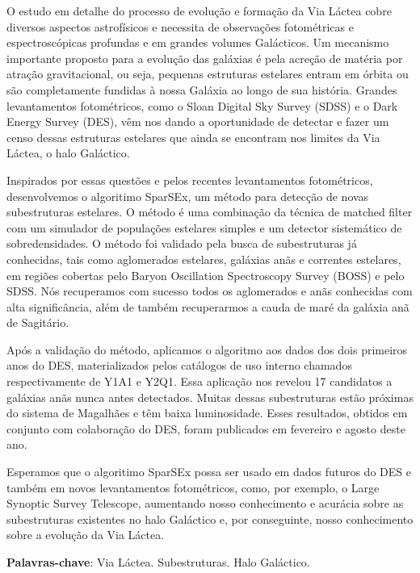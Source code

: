 \documentclass[
	12pt,				%
	openany,			%
	oneside,			%
	a4paper,			%
	english,			%
	brazil				%
	]{abntex2}
\begin{document}
\setlength{\absparsep}{18pt} %
\begin{resumo}

  \qquad O estudo  em detalhe do processo de evolução e formação da Via Láctea cobre diversos aspectos astrofísicos e necessita de observações  fotométricas e espectroscópicas profundas e em grandes volumes Galácticos. Um mecanismo importante proposto para a evolução das galáxias é pela acreção de matéria por atração gravitacional, ou seja, pequenas estruturas estelares entram em órbita ou são completamente fundidas à nossa Galáxia ao longo de sua história. Grandes levantamentos fotométricos, como o Sloan Digital Sky Survey (SDSS) e o Dark Energy Survey (DES), vêm nos dando a oportunidade de detectar e fazer um censo dessas estruturas estelares que ainda se encontram nos limites da Via Láctea, o halo Galáctico. \par
  \qquad Inspirados por essas questões e pelos recentes levantamentos fotométricos, desenvolvemos o algoritimo SparSEx, um método para detecção de novas subestruturas estelares. O método é uma combinação da técnica de matched filter com um simulador de populações estelares simples e um detector sistemático de sobredensidades. O método foi validado pela busca de subestruturas já conhecidas, tais como aglomerados estelares, galáxias anãs e correntes estelares,  em regiões cobertas  pelo Baryon Oscillation Spectroscopy Survey (BOSS) e pelo SDSS. Nós recuperamos com sucesso todos os aglomerados e anãs conhecidas com alta significância, além de também recuperarmos a cauda de maré da galáxia anã de Sagitário. \par
  \qquad Após a validação do método, aplicamos o algoritmo aos dados  dos dois primeiros anos do DES, materializados pelos catálogos de uso interno chamados respectivamente de Y1A1 e Y2Q1. Essa aplicação nos revelou 17 candidatos a galáxias anãs nunca antes detectados. Muitas dessas  subestruturas  estão próximas do sistema de Magalhães e têm baixa luminosidade. Esses resultados, obtidos em conjunto com colaboração do DES, foram publicados em fevereiro e agosto deste ano. \par
  \qquad  Esperamos que o algoritimo SparSEx possa ser usado em dados futuros do DES e também em novos levantamentos fotométricos, como, por exemplo, o Large Synoptic Survey Telescope, aumentando nosso conhecimento e acurácia sobre as subestruturas existentes no halo Galáctico e, por conseguinte, nosso conhecimento sobre a evolução da Via Láctea. 
	
 \textbf{Palavras-chave}: Via Láctea. Subestruturas. Halo Galáctico.
\end{resumo}
\end{document}
